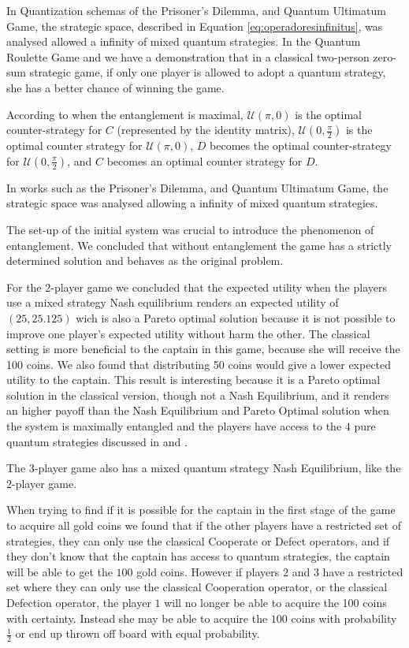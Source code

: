 \documentclass[10pt,twocolumn]{llncs}
\begin{document}
In Quantization schemas of the Prisoner's Dilemma\cite{Letters2002}\cite{Eisert2008}, and Quantum Ultimatum Game\cite{Fra2011}, the strategic space, described in Equation \ref{eq:operadoresinfinitus}, was analysed allowed a infinity of mixed quantum strategies. In the Quantum Roulette Game\cite{Salimi2009} and \cite{Meyer1999} we have a demonstration that in a classical two-person zero-sum strategic game, if only one player is allowed to adopt a quantum strategy, she has a better chance of winning the game. 

According to \cite{Du} when the entanglement is maximal, $\mathcal{U}(\pi, 0)$ is the optimal counter-strategy for $C$ (represented by the identity matrix), $\mathcal{U}(0, \frac{\pi}{2})$ is the optimal counter strategy for $\mathcal{U}(\pi, 0)$, $D$ becomes the optimal counter-strategy for $\mathcal{U}(0, \frac{\pi}{2})$, and $C$ becomes an optimal counter strategy for $D$. 

In works such as the Prisoner's Dilemma\cite{Letters2002}\cite{Eisert2008}, and Quantum Ultimatum Game\cite{Fra2011}, the strategic space was analysed allowing a infinity of mixed quantum strategies.

The set-up of the initial system was crucial to introduce the phenomenon of entanglement. We concluded that without entanglement the game has a strictly determined solution and behaves as the original problem.

For the $2$-player game we concluded that the expected utility when the players use a mixed strategy Nash equilibrium renders an expected utility of $(25, 25.125)$ wich is also a Pareto optimal solution because it is not possible to improve one player's expected utility without harm the other. The classical setting is more beneficial to the captain in this game, because she will receive the 100 coins. We also found that distributing 50 coins would give a lower expected utility to the captain. This result is interesting because it is a Pareto optimal solution in the classical version, though not a Nash Equilibrium, and it renders an higher payoff than the Nash Equilibrium and Pareto Optimal solution when the system is maximally entangled and the players have access to the $4$ pure quantum strategies discussed in \cite{Du} and \cite{Letters2002}. 

The $3$-player game also has a mixed quantum strategy Nash Equilibrium, like the $2$-player game. 

When trying to find if it is possible for the captain in the first stage of the game to acquire all gold coins we found that if the other players have a restricted set of strategies, they can only use the classical Cooperate or Defect operators, and if they don't know that the captain has access to quantum strategies, the captain will be able to get the $100$ gold coins. However if players $2$ and $3$ have a restricted set where they can only use the classical Cooperation operator, or the classical Defection operator, the player $1$ will no longer be able to acquire the 100 coins with certainty. Instead she may be able to acquire the $100$ coins with probability $\frac{1}{2}$ or end up thrown off board with equal probability.
\end{document}
